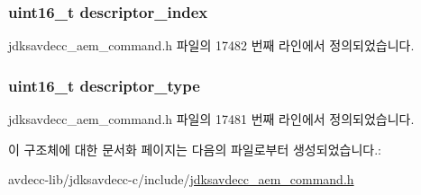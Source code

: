 \subsubsection[{\texorpdfstring{descriptor\+\_\+index}{descriptor_index}}]{\setlength{\rightskip}{0pt plus 5cm}uint16\+\_\+t descriptor\+\_\+index}\hypertarget{structjdksavdecc__aem__command__get__control__response_a042bbc76d835b82d27c1932431ee38d4}{}\label{structjdksavdecc__aem__command__get__control__response_a042bbc76d835b82d27c1932431ee38d4}


jdksavdecc\+\_\+aem\+\_\+command.\+h 파일의 17482 번째 라인에서 정의되었습니다.

\subsubsection[{\texorpdfstring{descriptor\+\_\+type}{descriptor_type}}]{\setlength{\rightskip}{0pt plus 5cm}uint16\+\_\+t descriptor\+\_\+type}\hypertarget{structjdksavdecc__aem__command__get__control__response_ab7c32b6c7131c13d4ea3b7ee2f09b78d}{}\label{structjdksavdecc__aem__command__get__control__response_ab7c32b6c7131c13d4ea3b7ee2f09b78d}


jdksavdecc\+\_\+aem\+\_\+command.\+h 파일의 17481 번째 라인에서 정의되었습니다.



이 구조체에 대한 문서화 페이지는 다음의 파일로부터 생성되었습니다.\+:\begin{DoxyCompactItemize}
\item 
avdecc-\/lib/jdksavdecc-\/c/include/\hyperlink{jdksavdecc__aem__command_8h}{jdksavdecc\+\_\+aem\+\_\+command.\+h}\end{DoxyCompactItemize}
